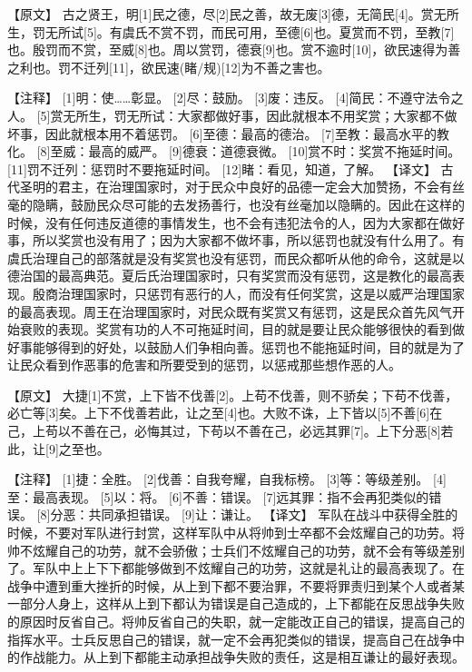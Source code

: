 \documentclass[a4paper,12pt,UTF8,twoside]{ctexbook}
\begin{document}
【原文】
古之贤王，明[1]民之德，尽[2]民之善，故无废[3]德，无简民[4]。赏无所生，罚无所试[5]。有虞氏不赏不罚，而民可用，至德[6]也。夏赏而不罚，至教[7]也。殷罚而不赏，至威[8]也。周以赏罚，德衰[9]也。赏不逾时[10]，欲民速得为善之利也。罚不迁列[11]，欲民速(睹/规)[12]为不善之害也。



【注释】
[1]明：使……彰显。
[2]尽：鼓励。
[3]废：违反。
[4]简民：不遵守法令之人。
[5]赏无所生，罚无所试：大家都做好事，因此就根本不用奖赏；大家都不做坏事，因此就根本用不着惩罚。
[6]至德：最高的德治。
[7]至教：最高水平的教化。
[8]至威：最高的威严。
[9]德衰：道德衰微。
[10]赏不时：奖赏不拖延时间。
[11]罚不迁列：惩罚时不要拖延时间。
[12]睹：看见，知道，了解。
【译文】
古代圣明的君主，在治理国家时，对于民众中良好的品德一定会大加赞扬，不会有丝毫的隐瞒，鼓励民众尽可能的去发扬善行，也没有丝毫加以隐瞒的。因此在这样的时候，没有任何违反道德的事情发生，也不会有违犯法令的人，因为大家都在做好事，所以奖赏也没有用了；因为大家都不做坏事，所以惩罚也就没有什么用了。有虞氏治理自己的部落就是没有奖赏也没有惩罚，而民众都听从他的命令，这就是以德治国的最高典范。夏后氏治理国家时，只有奖赏而没有惩罚，这是教化的最高表现。殷商治理国家时，只惩罚有恶行的人，而没有任何奖赏，这是以威严治理国家的最高表现。周王在治理国家时，对民众既有奖赏又有惩罚，这是民众首先风气开始衰败的表现。奖赏有功的人不可拖延时间，目的就是要让民众能够很快的看到做好事能够得到的好处，以鼓励人们争相向善。惩罚也不能拖延时间，目的就是为了让民众看到作恶事的危害和所要受到的惩罚，以惩戒那些想作恶的人。

【原文】
大捷[1]不赏，上下皆不伐善[2]。上苟不伐善，则不骄矣；下苟不伐善，必亡等[3]矣。上下不伐善若此，让之至[4]也。大败不诛，上下皆以[5]不善[6]在己，上苟以不善在己，必悔其过，下苟以不善在己，必远其罪[7]。上下分恶[8]若此，让[9]之至也。

【注释】
[1]捷：全胜。
[2]伐善：自我夸耀，自我标榜。
[3]等：等级差别。
[4]至：最高表现。
[5]以：将。
[6]不善：错误。
[7]远其罪：指不会再犯类似的错误。
[8]分恶：共同承担错误。
[9]让：谦让。
【译文】
军队在战斗中获得全胜的时候，不要对军队进行封赏，这样军队中从将帅到士卒都不会炫耀自己的功劳。将帅不炫耀自己的功劳，就不会骄傲；士兵们不炫耀自己的功劳，就不会有等级差别了。军队中上上下下都能够做到不炫耀自己的功劳，这就是礼让的最高表现了。在战争中遭到重大挫折的时候，从上到下都不要治罪，不要将罪责归到某个人或者某一部分人身上，这样从上到下都认为错误是自己造成的，上下都能在反思战争失败的原因时反省自己。将帅反省自己的失职，就一定能改正自己的错误，提高自己的指挥水平。士兵反思自己的错误，就一定不会再犯类似的错误，提高自己在战争中的作战能力。从上到下都能主动承担战争失败的责任，这是相互谦让的最好表现。
\end{document}
